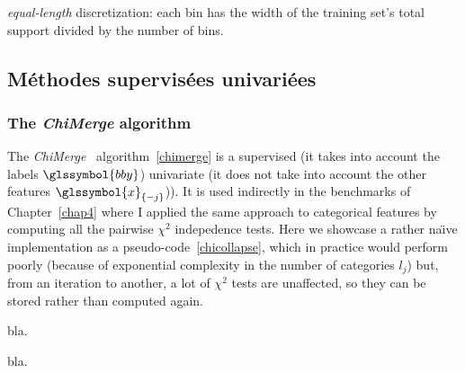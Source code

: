 \begin{algorithm}[H]
 \KwResult{$\hat{\q}$}
 \For{$j=1$ to $d$}{
Let $w_j = \max{i} x_{i,j} - \min{i} x_{i,j}$\;
Let $c_0=-\infty$, $c_{m_j} = + \infty$ and $c_{j,h} = \frac{w_j \cdot h}{m_j} + \min{i} x_{i,j}$\;
Let $C_{j,h} = ]c_{j,h-1};c_{j,h}]$ and $\hat{\q_j(\cdot)} = (\hat{q}_{j,h}(\cdot))_1^{m_j}$\;
Set $\hat{q}_{j,h}(\cdot)=\mathds{1}_{C_{j,h}}(\cdot)$.
}
 \caption{\label{equal-length-disc} \textit{equal-length} discretization: each bin has the width of the training set's total support divided by the number of bins.}
\end{algorithm}



\subsection{Méthodes supervisées univariées}

\subsubsection{The \textit{ChiMerge} algorithm}

The \textit{ChiMerge}~\cite{kerber1992chimerge} algorithm~\ref{chimerge} is a supervised (it takes into account the labels $\glssymbol{bby}$) univariate (it does not take into account the other features $\glssymbol{x}_{\{-j\}}$)). It is used indirectly in the benchmarks of Chapter~\ref{chap4} where I applied the same approach to categorical features by computing all the pairwise $\chi^2$ indepedence tests. Here we showcase a rather na\"{\i}ve implementation as a pseudo-code~\ref{chicollapse}, which in practice would perform poorly (because of exponential complexity in the number of categories $l_j$) but, from an iteration to another, a lot of $\chi^2$ tests are unaffected, so they can be stored rather than computed again.

\begin{algorithm}[H]
 \KwResult{$\hat{\q}$}
 \For{$j=1$ to $d$}{
Let $w_j = \max{i} x_{i,j} - \min{i} x_{i,j}$\;
Let $c_0=-\infty$, $c_{m_j} = + \infty$ and $c_{j,h} = \frac{w_j \cdot h}{m_j} + \min{i} x_{i,j}$\;
Let $C_{j,h} = ]c_{j,h-1};c_{j,h}]$ and $\hat{\q_j(\cdot)} = (\hat{q}_{j,h}(\cdot))_1^{m_j}$\;
Set $\hat{q}_{j,h}(\cdot)=\mathds{1}_{C_{j,h}}(\cdot)$.
}
 \caption{\label{chimerge} bla.}
\end{algorithm}


\begin{algorithm}[H]
 \KwResult{$\hat{\q}$}
 \For{$j=1$ to $d$}{
Let $w_j = \max{i} x_{i,j} - \min{i} x_{i,j}$\;
Let $c_0=-\infty$, $c_{m_j} = + \infty$ and $c_{j,h} = \frac{w_j \cdot h}{m_j} + \min{i} x_{i,j}$\;
Let $C_{j,h} = ]c_{j,h-1};c_{j,h}]$ and $\hat{\q_j(\cdot)} = (\hat{q}_{j,h}(\cdot))_1^{m_j}$\;
Set $\hat{q}_{j,h}(\cdot)=\mathds{1}_{C_{j,h}}(\cdot)$.
}
 \caption{\label{chicollapse} bla.}
\end{algorithm}


